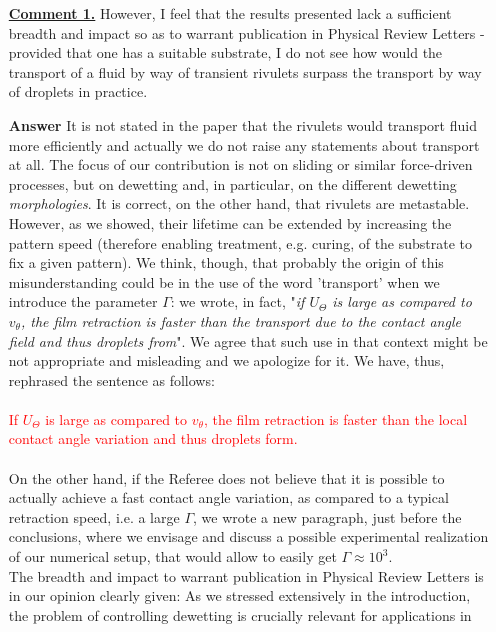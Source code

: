 \documentclass[12pt,english]{article}
\begin{document}
\begin{itemize}

\item[ \textbf{\underline{Comment 1.}}]
{ 
However, I feel that the
results presented lack a sufficient breadth and impact so as to
warrant publication in Physical Review Letters - provided that one has
a suitable substrate, I do not see how would the transport of a fluid
by way of transient rivulets surpass the transport by way of droplets
in practice.
}

\item[ \textbf{{Answer}}]
{ 
It is not stated in the paper that the rivulets would transport fluid more efficiently and actually we do not raise any statements about transport at all. The focus of our contribution is not on sliding or similar force-driven processes, but 
on dewetting and, in particular, on the different dewetting {\it morphologies}. 
It is correct, on the other hand, that rivulets are metastable. However, as 
we showed, their lifetime can be extended by increasing the pattern speed
(therefore enabling treatment, e.g. curing, of the substrate to 
fix a given pattern).
We think, though, that probably the origin of this misunderstanding could be in the use of 
the word 'transport' when we introduce the parameter $\Gamma$: we wrote, in fact, 
"{\it if $U_{\Theta}$ is large as compared to $v_{\theta}$, the film retraction is faster than 
the transport due to the contact angle field and thus droplets from}". We agree that such use 
in that context might be not appropriate and misleading and we apologize for it. We have, thus,
rephrased the sentence as follows:\\
\\
\textcolor{red}{If $U_{\Theta}$ is large as compared to $v_{\theta}$, the film retraction is faster than 
the local contact angle variation and thus droplets form.}\\
\\
On the other hand, if the Referee does not believe that it is possible to actually achieve a fast 
contact angle variation, as compared to a typical retraction speed, i.e. a large $\Gamma$, we wrote a new paragraph, just before the conclusions, where we envisage and discuss a possible experimental realization of our numerical setup, that would allow to easily get $\Gamma \approx 10^3$.\\
The breadth and impact to warrant publication in Physical Review Letters is in our opinion clearly given: As we stressed extensively in the introduction,
the problem of controlling dewetting is crucially relevant for applications in 
}
\end{itemize}
\end{document}
